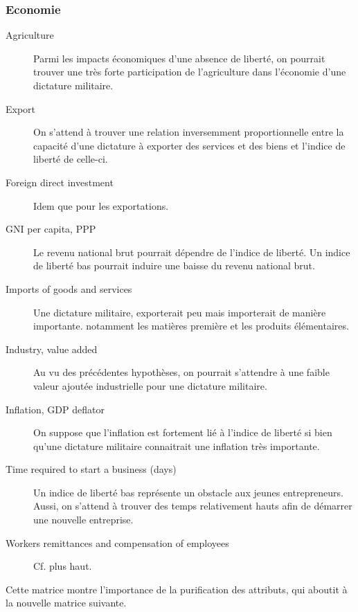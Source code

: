 \subsubsection{Economie}
\begin{description}
\item [Agriculture]
Parmi les impacts économiques d'une absence de liberté, on pourrait trouver une très forte participation de l'agriculture dans l'économie d'une dictature militaire.
\item [Export]
On s'attend à trouver une relation inversemment proportionnelle entre la capacité d'une dictature à exporter des services et des biens et l'indice de liberté de celle-ci.
\item [Foreign direct investment]
Idem que pour les exportations. 
\item [GNI per capita, PPP ]
Le revenu national brut pourrait dépendre de l'indice de liberté. Un indice de liberté bas pourrait induire une baisse du revenu national brut.
\item [Imports of goods and services] 
Une dictature militaire, exporterait peu mais importerait de manière importante. notamment les matières première et les produits élémentaires.
\item [Industry, value added]
Au vu des précédentes hypothèses, on pourrait s'attendre à une faible valeur ajoutée industrielle pour une dictature militaire. 
\item [Inflation, GDP deflator] 
On suppose que l'inflation est fortement lié à l'indice de liberté si bien qu'une dictature militaire connaitrait une inflation très importante.
\item [Time required to start a business (days)]
Un indice de liberté bas représente un obstacle aux jeunes entrepreneurs. Aussi, on s'attend à trouver des temps relativement hauts afin de démarrer une nouvelle entreprise. 
\item [Workers remittances and compensation of employees]
Cf. plus haut.
\end{description}

Cette matrice montre l'importance de la purification des attributs, qui aboutit à la nouvelle matrice suivante.

